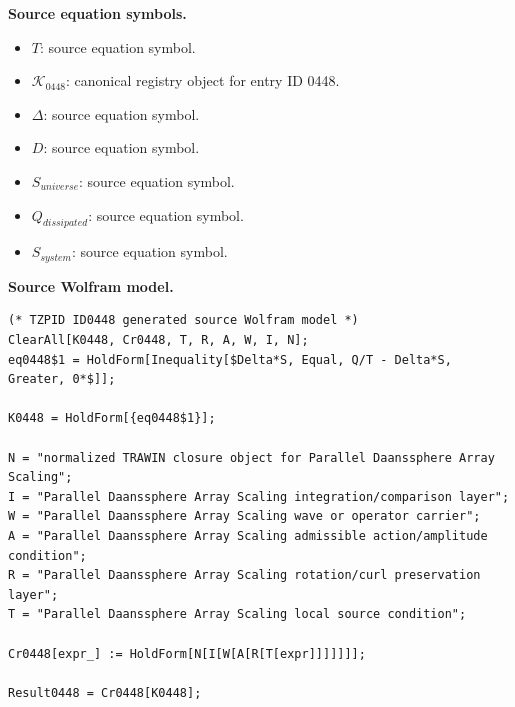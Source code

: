 \begin{minipage}[t]{0.49\linewidth}
\begingroup
\small
\raggedright
\textbf{Source equation symbols.}\par
\begin{itemize}[leftmargin=1.35em,itemsep=1pt,topsep=1pt,parsep=0pt]
    \item $T$: source equation symbol.
    \item $\mathcal{K}_{0448}$: canonical registry object for entry ID 0448.
    \item $\Delta$: source equation symbol.
    \item $D$: source equation symbol.
    \item $S_{universe}$: source equation symbol.
    \item $Q_{dissipated}$: source equation symbol.
    \item $S_{system}$: source equation symbol.
\end{itemize}
\endgroup
\end{minipage}\hfill
\begin{minipage}[t]{0.47\linewidth}
\begingroup
\scriptsize
\raggedright
\textbf{Source Wolfram model.}\par
\begin{Verbatim}[fontsize=\tiny,breaklines=true,breakanywhere=true]
(* TZPID ID0448 generated source Wolfram model *)
ClearAll[K0448, Cr0448, T, R, A, W, I, N];
eq0448$1 = HoldForm[Inequality[$Delta*S, Equal, Q/T - Delta*S, Greater, 0*$]];

K0448 = HoldForm[{eq0448$1}];

N = "normalized TRAWIN closure object for Parallel Daanssphere Array Scaling";
I = "Parallel Daanssphere Array Scaling integration/comparison layer";
W = "Parallel Daanssphere Array Scaling wave or operator carrier";
A = "Parallel Daanssphere Array Scaling admissible action/amplitude condition";
R = "Parallel Daanssphere Array Scaling rotation/curl preservation layer";
T = "Parallel Daanssphere Array Scaling local source condition";

Cr0448[expr_] := HoldForm[N[I[W[A[R[T[expr]]]]]]];

Result0448 = Cr0448[K0448];
\end{Verbatim}
\endgroup
\end{minipage}

